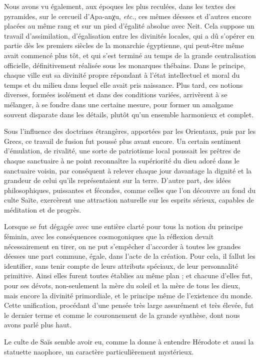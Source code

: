 \documentclass[a4paper, 11pt, oneside]{article}
\begin{document}
Nous avons vu également, aux époques les plus reculées, dans les textes des pyramides, sur le cercueil d'Apa-anχu, \emph{etc.}, ces mêmes déesses et d'autres encore placées au même rang et sur un pied d'égalité absolue avec Neit. Cela suppose un travail d'assimilation, d'égalisation entre les divinités locales, qui a dû s'opérer en partie dès les premiers siècles de la monarchie égyptienne, qui peut-être même avait commencé plus tôt, et qui s'est terminé au temps de la grande centralisation officielle, définitivement réalisée sous les monarques thébains. Dans le principe, chaque ville eut sa divinité propre répondant à l'état intellectuel et moral du temps et du milieu dans lequel elle avait pris naissance. Plus tard, ces notions diverses, formées isolément et dans des conditions variées, arrivèrent à se mélanger, à se fondre dans une certaine mesure, pour former un amalgame souvent disparate dans les détails, plutôt qu'un ensemble harmonieux et complet.

Sous l'influence des doctrines étrangères, apportées par les Orientaux, puis par les Grecs, ce travail de fusion fut poussé plus avant encore. Un certain sentiment d'émulation, de rivalité, une sorte de patriotisme local poussait les prêtres de chaque sanctuaire à ne point reconnaître la supériorité du dieu adoré dans le sanctuaire voisin, par conséquent à relever chaque jour davantage la dignité et la grandeur de celui qu'ils représentaient sur la terre. D'autre part, des idées philosophiques, puissantes et fécondes, comme celles que l'on découvre au fond du culte Saïte, exercèrent une attraction naturelle sur les esprits sérieux, capables de méditation et de progrès.

Lorsque se fut dégagée avec une entière clarté pour tous la notion du principe féminin, avec les conséquences cosmogoniques que la réflexion devait nécessairement en tirer, on ne put s'empêcher d'accorder à toutes les grandes déesses une part commune, égale, dans l'acte de la création. Pour cela, il fallut les identifier, sans tenir compte de leurs attributs spéciaux, de leur personnalité primitive. Ainsi elles furent toutes établies au même plan ; et chacune d'elles fut, pour ses dévots, non-seulement la mère du soleil et la mère de tous les dieux, mais encore la divinité primordiale, et le principe même de l'existence du monde. Cette unification, procédant d'une pensée très large assurément et très élevée, fut le dernier terme et comme le couronnement de la grande synthèse, dont nous avons parlé plus haut.

Le culte de Saïs semble avoir eu, comme la donne à entendre Hérodote et aussi la statuette naophore, un caractère particulièrement mystérieux.
\end{document}
